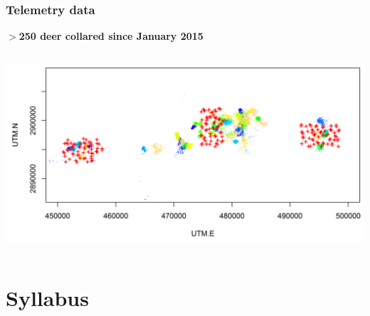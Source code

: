 \documentclass[color=usenames,dvipsnames]{beamer}
\begin{document}






\begin{frame}
  \frametitle{Telemetry data}
  \centering
  \bf
  $>$250 deer collared since January 2015 \\
  \begin{columns}
    \column{\dimexpr\paperwidth-10pt}
    \includegraphics[width=\textwidth]{figs/camTelem}
  \end{columns}
\end{frame}







\section{Syllabus}
\end{document}
